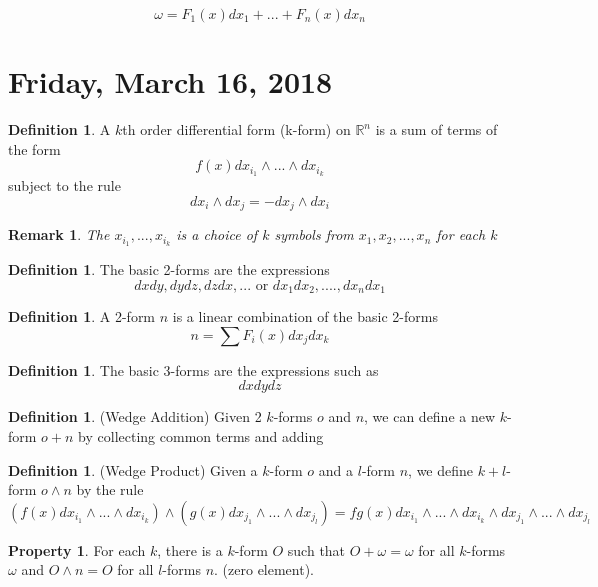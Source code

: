 \documentclass[12pt]{article}
\theoremstyle{plain}
\newtheorem*{remark}{Remark}
\theoremstyle{definition}
\newtheorem{definition}[theorem]{Definition}
\newtheorem{property}[theorem]{Property}
\begin{document}
$$\omega = F_1 (x) dx_1 + ... + F_n (x) dx_n$$

\newpage

\section{Friday, March 16, 2018}

\begin{definition}
    A $k$th order differential form (k-form) on $\mathbb{R}^n$ is a sum of terms of the form
    $$f(x) dx_{i_1} \wedge ... \wedge dx_{i_k}$$
    subject to the rule
    $$dx_i \wedge dx_j = - dx_j \wedge dx_i$$
\end{definition}

\begin{remark}
    The $x_{i_1},...,x_{i_k}$ is a choice of $k$ symbols from $x_1, x_2, ..., x_n$ for each $k$
\end{remark}

\begin{definition}
    The basic 2-forms are the expressions
    $$dxdy, dydz,dzdx, ... \text{ or } dx_1 dx_2 ,...., dx_n dx_1$$
\end{definition}

\begin{definition}
    A 2-form $n$ is a linear combination of the basic 2-forms
    $$n=\sum F_i (x) dx_j dx_k$$
\end{definition}

\begin{definition}
    The basic 3-forms are the expressions such as
    $$dxdydz$$
\end{definition}
\newpage

\begin{definition}
    (Wedge Addition) Given 2 $k$-forms $o$ and $n$, we can define a new $k$-form $o + n$ by collecting common terms and adding
\end{definition}

\begin{definition}
    (Wedge Product) Given a $k$-form $o$ and a $l$-form $n$, we define $k+l$-form $o \wedge n$ by the rule
    $$(f(x)dx_{i_1}\wedge ... \wedge dx_{i_k})\wedge(g(x)dx_{j_1}\wedge ... \wedge dx_{j_l}) = fg(x)dx_{i_1}\wedge ... \wedge dx_{i_k} \wedge dx_{j_1}\wedge ... \wedge dx_{j_l} $$
\end{definition}

\begin{property}
    For each $k$, there is a $k$-form $O$ such that $O + \omega = \omega$ for all $k$-forms $\omega$ and $O \wedge n = O$ for all $l$-forms $n$. (zero element).
\end{property}
\end{document}
